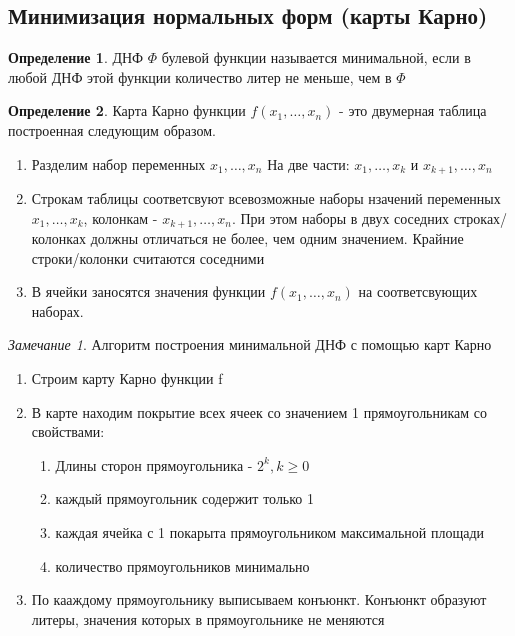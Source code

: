 \documentclass[a4paper]{article}
\theoremstyle{definition}
\newtheorem*{definition}{Определение}
\theoremstyle{remark}
\newtheorem*{remark}{Замечание}
\begin{document}
    \subsection{Минимизация нормальных форм (карты Карно)}
	\begin{definition}
		ДНФ $\Phi$ булевой функции называется минимальной, если в любой ДНФ этой функции количество литер не меньше, чем в $\Phi$
	\end{definition}
	\begin{definition}
		Карта Карно функции $f(x_1, \dots , x_n)$ - это двумерная таблица построенная следующим образом.
		\begin{enumerate}
			\item Разделим набор переменных $x_1, \dots , x_n$ На две части: $x_1, \dots , x_k$ и $x_{k+1}, \dots , x_n$
			\item Строкам таблицы соответсвуют всевозможные наборы нзачений переменных $x_1, \dots , x_k$, колонкам - $x_{k+1}, \dots , x_n$. При этом наборы в двух соседних строках/колонках должны отличаться не более, чем одним значением. Крайние строки/колонки считаются соседними
			\item В ячейки заносятся значения функции $f(x_1, \dots , x_n)$ на соответсвующих наборах.
		\end{enumerate}
	\end{definition}
	\begin{remark}
		Алгоритм построения минимальной ДНФ с помощью карт Карно
		\begin{enumerate}
			\item Строим карту Карно функции f
			\item В карте находим покрытие всех ячеек со значением 1 прямоугольникам со свойствами:
			\begin{enumerate}
				\item Длины сторон прямоугольника - $2^k, k \geq 0$
				\item каждый прямоугольник содержит только 1
				\item каждая ячейка с 1 покарыта прямоугольником максимальной площади
				\item количество прямоугольников минимально
			\end{enumerate}
			\item По кааждому прямоугольнику выписываем конъюнкт. Конъюнкт образуют литеры, значения которых в прямоугольнике не меняются
		\end{enumerate}
	\end{remark}
\end{document}
